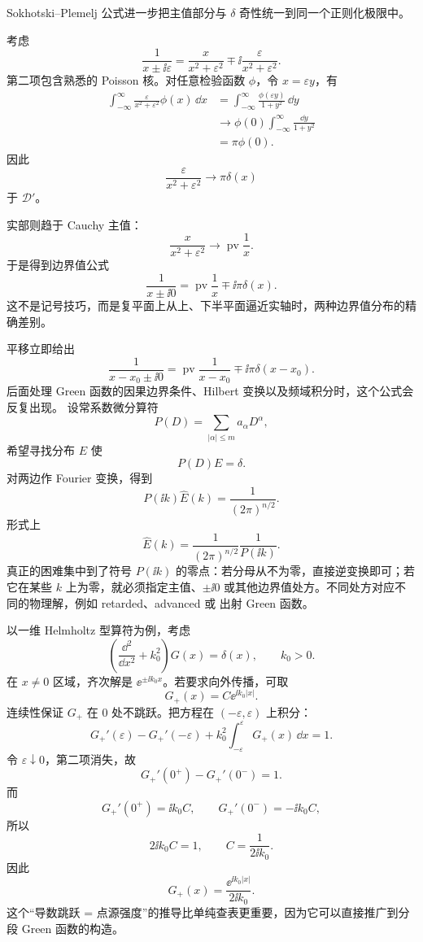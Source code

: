 Sokhotski--Plemelj 公式进一步把主值部分与 $\delta$ 奇性统一到同一个正则化极限中。

考虑
\[
\frac1{x\pm \ii\varepsilon}
=\frac{x}{x^2+\varepsilon^2}
\mp \ii\frac{\varepsilon}{x^2+\varepsilon^2}.
\]
第二项包含熟悉的 Poisson 核。对任意检验函数 $\phi$，令 $x=\varepsilon y$，有
\[
\begin{aligned}
\int_{-\infty}^{\infty}
\frac{\varepsilon}{x^2+\varepsilon^2}\phi(x)\,\dd x
&=\int_{-\infty}^{\infty}\frac{\phi(\varepsilon y)}{1+y^2}\,\dd y\\
&\longrightarrow \phi(0)\int_{-\infty}^{\infty}\frac{\dd y}{1+y^2}\\
&=\pi\phi(0).
\end{aligned}
\]
因此
\[
\frac{\varepsilon}{x^2+\varepsilon^2}
\longrightarrow \pi\delta(x)
\]
于 $\mathcal D'$。

实部则趋于 Cauchy 主值：
\[
\frac{x}{x^2+\varepsilon^2}
\longrightarrow \operatorname{pv}\frac1x.
\]
于是得到边界值公式
\begin{equation*}\boxed{
\frac1{x\pm \ii 0}
=\operatorname{pv}\frac1x\mp \ii\pi\delta(x)
}.\end{equation*}
这不是记号技巧，而是复平面上从上、下半平面逼近实轴时，两种边界值分布的精确差别。

平移立即给出
\[
\frac1{x-x_0\pm \ii 0}
=\operatorname{pv}\frac1{x-x_0}\mp \ii\pi\delta(x-x_0).
\]
后面处理 Green 函数的因果边界条件、Hilbert 变换以及频域积分时，这个公式会反复出现。
设常系数微分算符
\[
P(D)=\sum_{|\alpha|\le m}a_\alpha D^\alpha,
\]
希望寻找分布 $E$ 使
\[
P(D)E=\delta.
\]
对两边作 Fourier 变换，得到
\[
P(\ii k)\widehat E(k)=\frac1{(2\pi)^{n/2}}.
\]
形式上
\begin{equation*}\boxed{
\widehat E(k)
=\frac1{(2\pi)^{n/2}}\frac1{P(\ii k)}
}.\end{equation*}
真正的困难集中到了符号 $P(\ii k)$ 的零点：若分母从不为零，直接逆变换即可；若它在某些 $k$ 上为零，就必须指定主值、$\pm \ii 0$ 或其他边界值处方。不同处方对应不同的物理解，例如 retarded、advanced 或 出射 Green 函数。

以一维 Helmholtz 型算符为例，考虑
\[
\left(\frac{\dd^2}{\dd x^2}+k_0^2\right)G(x)=\delta(x),
\qquad k_0>0.
\]
在 $x\neq0$ 区域，齐次解是 $\ee^{\pm \ii k_0x}$。若要求向外传播，可取
\[
G_+(x)=C \ee^{\ii k_0|x|}.
\]
连续性保证 $G_+$ 在 $0$ 处不跳跃。把方程在 $(-\varepsilon,\varepsilon)$ 上积分：
\[
G_+'(\varepsilon)-G_+'(-\varepsilon)
+k_0^2\int_{-\varepsilon}^{\varepsilon}G_+(x)\,\dd x=1.
\]
令 $\varepsilon\downarrow0$，第二项消失，故
\[
G_+'(0^+)-G_+'(0^-)=1.
\]
而
\[
G_+'(0^+)=\ii k_0C,
\qquad
G_+'(0^-)=-\ii k_0C,
\]
所以
\[
2\ii k_0C=1,
\qquad
C=\frac1{2\ii k_0}.
\]
因此
\begin{equation*}\boxed{
G_+(x)=\frac{\ee^{\ii k_0|x|}}{2\ii k_0}
}.\end{equation*}
这个“导数跳跃 = 点源强度”的推导比单纯查表更重要，因为它可以直接推广到分段 Green 函数的构造。

